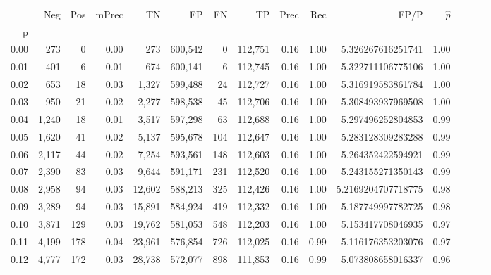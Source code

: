\begin{tabular}{rrrrrrrrrrrrrrr}
\toprule
{} &     Neg &    Pos & mPrec &       TN &       FP &       FN &       TP &  Prec &   Rec &                   FP/P & $\hat{p}$ \\
p    &         &        &       &          &          &          &          &       &       &                        &           \\
\midrule
0.00 &     273 &      0 &  0.00 &      273 &  600,542 &        0 &  112,751 &  0.16 &  1.00 &      5.326267616251741 &      1.00 \\
0.01 &     401 &      6 &  0.01 &      674 &  600,141 &        6 &  112,745 &  0.16 &  1.00 &      5.322711106775106 &      1.00 \\
0.02 &     653 &     18 &  0.03 &    1,327 &  599,488 &       24 &  112,727 &  0.16 &  1.00 &      5.316919583861784 &      1.00 \\
0.03 &     950 &     21 &  0.02 &    2,277 &  598,538 &       45 &  112,706 &  0.16 &  1.00 &      5.308493937969508 &      1.00 \\
0.04 &   1,240 &     18 &  0.01 &    3,517 &  597,298 &       63 &  112,688 &  0.16 &  1.00 &      5.297496252804853 &      0.99 \\
0.05 &   1,620 &     41 &  0.02 &    5,137 &  595,678 &      104 &  112,647 &  0.16 &  1.00 &      5.283128309283288 &      0.99 \\
0.06 &   2,117 &     44 &  0.02 &    7,254 &  593,561 &      148 &  112,603 &  0.16 &  1.00 &      5.264352422594921 &      0.99 \\
0.07 &   2,390 &     83 &  0.03 &    9,644 &  591,171 &      231 &  112,520 &  0.16 &  1.00 &      5.243155271350143 &      0.99 \\
0.08 &   2,958 &     94 &  0.03 &   12,602 &  588,213 &      325 &  112,426 &  0.16 &  1.00 &     5.2169204707718775 &      0.98 \\
0.09 &   3,289 &     94 &  0.03 &   15,891 &  584,924 &      419 &  112,332 &  0.16 &  1.00 &      5.187749997782725 &      0.98 \\
0.10 &   3,871 &    129 &  0.03 &   19,762 &  581,053 &      548 &  112,203 &  0.16 &  1.00 &      5.153417708046935 &      0.97 \\
0.11 &   4,199 &    178 &  0.04 &   23,961 &  576,854 &      726 &  112,025 &  0.16 &  0.99 &      5.116176353203076 &      0.97 \\
0.12 &   4,777 &    172 &  0.03 &   28,738 &  572,077 &      898 &  111,853 &  0.16 &  0.99 &      5.073808658016337 &      0.96 \\

\end{tabular}
